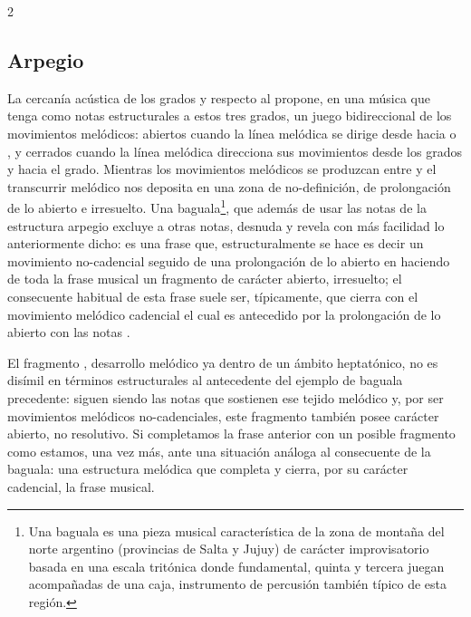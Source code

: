 \documentclass[a4paper,11pt]{article}
\begin{document}
\begin{multicols}{2}
  \subsection{Arpegio}\label{subsec:arpegio}
  La cercanía acústica de los grados  y  respecto al  propone, en una música que tenga como notas estructurales a estos tres grados, un juego bidireccional de los movimientos melódicos: abiertos cuando la línea melódica se dirige desde  hacia  o , y cerrados cuando la línea melódica direcciona sus movimientos desde los grados  y  hacia el  grado. Mientras los movimientos melódicos se produzcan entre  y  el transcurrir melódico nos deposita en una zona de no-definición, de prolongación de lo abierto e irresuelto. Una baguala\footnote{Una baguala es una pieza musical característica de la zona de montaña del norte argentino (provincias de Salta y Jujuy) de carácter improvisatorio basada en una escala tritónica donde fundamental, quinta y tercera juegan acompañadas de una caja, instrumento de percusión también típico de esta región.}, que además de usar las notas de la estructura arpegio excluye a otras notas, desnuda y revela con más facilidad lo anteriormente dicho:  es una frase que, estructuralmente se hace  es decir un movimiento no-cadencial  seguido de una prolongación de lo abierto en  haciendo de toda la frase musical un fragmento de carácter abierto, irresuelto; el consecuente habitual de esta frase suele ser, típicamente,  que cierra con el movimiento melódico cadencial  el cual es antecedido por la prolongación de lo abierto con las notas \hbox{.}

  El fragmento , desarrollo melódico ya dentro de un ámbito heptatónico, no es disímil en términos estructurales al antecedente del ejemplo de baguala precedente:  siguen siendo las notas que sostienen ese tejido melódico y, por ser movimientos melódicos no-cadenciales, este fragmento también posee carácter abierto, no resolutivo. Si completamos la frase anterior con un posible fragmento como  estamos, una vez más, ante una situación análoga al consecuente de la baguala: una estructura melódica  que completa y cierra, por su carácter cadencial, la frase musical.


\end{multicols}
\end{document}
